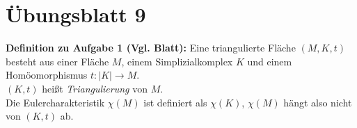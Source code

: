 %
\section{Übungsblatt 9}

\textbf{Definition zu Aufgabe 1 (Vgl. Blatt):} Eine triangulierte Fläche \( (M, K, t) \) besteht aus einer Fläche \( M \), einem Simplizialkomplex \( K \) und einem Homöomorphismus \( t: \vert K \vert \to M \). \\
\( (K, t) \) heißt \emph{Triangulierung} von \( M \). \\
Die Eulercharakteristik \( \chi(M) \) ist definiert als \( \chi(K) \), \( \chi(M) \) hängt also nicht von \( (K,t) \) ab.

